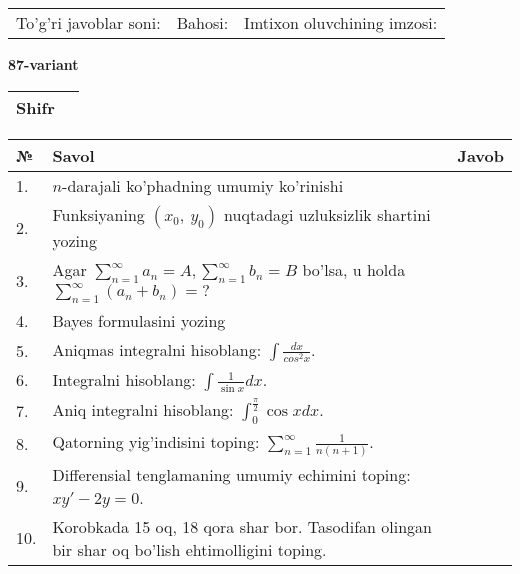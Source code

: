 \documentclass{article}
\begin{document}
  \vspace{1cm}
  
  \begin{tabular}{lll}
  To'g'ri javoblar soni: \underline{\hspace{1.5cm}} & 
  Bahosi: \underline{\hspace{1.5cm}} & 
  Imtixon oluvchining imzosi: \underline{\hspace{2cm}} \\
  \end{tabular}
  
  \egroup
  
  \newpage
  
  
  \textbf{87-variant}\\
  
  \bgroup
  \def\arraystretch{1.6} %
  
  \begin{tabular}{|m{5.7cm}|m{9.5cm}|}
  \hline
  Shifr & \\
  \hline
  \end{tabular}
  
  \vspace{1cm}
  
  \begin{tabular}{|m{0.7cm}|m{10cm}|m{4cm}|}
  \hline
  № & Savol & Javob \\
  \hline
  1. & \(n\)-darajali ko'phadning umumiy ko'rinishi &  \\
  \hline
  2. & Funksiyaning \((x_{0},\ y_{0})\) nuqtadagi uzluksizlik shartini yozing &  \\
  \hline
  3. & Agar \(\sum_{n = 1}^{\infty}a_{n} = A,\sum_{n = 1}^{\infty}b_{n} = B\) bo'lsa, u holda \(\sum_{n = 1}^{\infty}\left( a_{n} + b_{n} \right) = ?\) &  \\
  \hline
  4. & Bayes formulasini yozing &  \\
  \hline
  5. & Aniqmas integralni hisoblang: \(\int \frac{dx}{cos^{2}x}\). &  \\
  \hline
  6. & Integralni hisoblang: \(\int {\frac{1}{\sin x}dx}\). &  \\
  \hline
  7. & Aniq integralni hisoblang: \(\int_{0}^{\frac{\pi}{2}}{\cos xdx}\). &  \\
  \hline
  8. & Qatorning yig'indisini toping: \(\sum_{n = 1}^{\infty}\frac{1}{n(n + 1)}\). &  \\
  \hline
  9. & Differensial tenglamaning umumiy echimini toping: \(xy' - 2y = 0\). &  \\
  \hline
  10. & Korobkada 15 oq, 18 qora shar bor. Tasodifan olingan bir shar oq bo'lish ehtimolligini toping. &  \\
  \hline
  \end{tabular}
  
\end{document}
